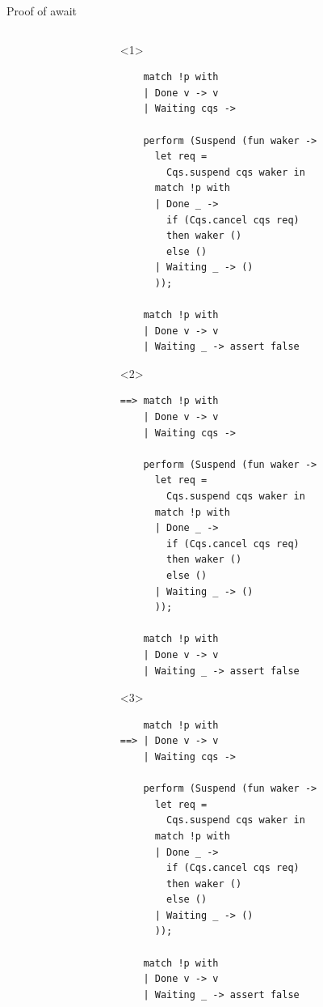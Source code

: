 \documentclass[aspectratio=43]{beamer}
\newcommand{\pers}[1]{\Box\; #1}
\begin{document}
\begin{frame}[fragile,t]{Proof of await}
\begin{columns}
\begin{column}[T]{0.5\textwidth}
        \end{column}
        \begin{column}[T]{0.49\textwidth}
            \only<1-3,11-13>{\textbf{Goal:} \textit{Return \texttt{v} with \texttt{\(\pers{(\Phi\; v)}\)}}}
            \begin{onlyenv}<1>
                \begin{verbatim}
    match !p with
    | Done v -> v
    | Waiting cqs ->
    
    perform (Suspend (fun waker ->
      let req = 
        Cqs.suspend cqs waker in
      match !p with
      | Done _ -> 
        if (Cqs.cancel cqs req)
        then waker ()
        else ()
      | Waiting _ -> ()
      ));
    
    match !p with
    | Done v -> v
    | Waiting _ -> assert false
        \end{verbatim}
            \end{onlyenv}

            \begin{onlyenv}<2>
                \begin{verbatim}
==> match !p with
    | Done v -> v
    | Waiting cqs ->
    
    perform (Suspend (fun waker ->
      let req = 
        Cqs.suspend cqs waker in
      match !p with
      | Done _ -> 
        if (Cqs.cancel cqs req)
        then waker ()
        else ()
      | Waiting _ -> ()
      ));
    
    match !p with
    | Done v -> v
    | Waiting _ -> assert false
        \end{verbatim}
            \end{onlyenv}

            \begin{onlyenv}<3>
                \begin{verbatim}
    match !p with
==> | Done v -> v
    | Waiting cqs ->
    
    perform (Suspend (fun waker ->
      let req = 
        Cqs.suspend cqs waker in
      match !p with
      | Done _ -> 
        if (Cqs.cancel cqs req)
        then waker ()
        else ()
      | Waiting _ -> ()
      ));
    
    match !p with
    | Done v -> v
    | Waiting _ -> assert false
        \end{verbatim}
            \end{onlyenv}


\end{column}
\end{columns}
\end{frame}
\end{document}
